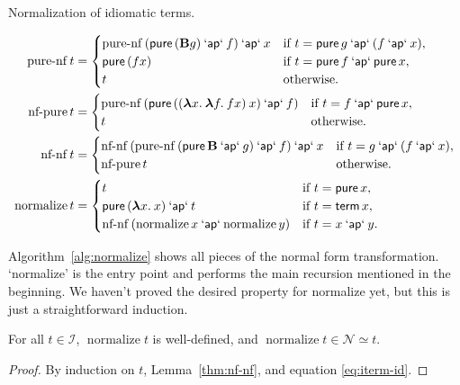 \begin{algorithm}
\caption{Normalization of idiomatic terms.}
\label{alg:normalize}
\begin{align*}
	\operatorname{pure-nf} t &= \begin{cases}
		\operatorname{pure-nf}{(\operatorname{\mathsf{pure}}{(\mathbf{B} g)} \mathbin{\mathsf{`ap`}} f)} \mathbin{\mathsf{`ap`}} x
			&\text{if } t = \operatorname{\mathsf{pure}} g \mathbin{\mathsf{`ap`}} (f \mathbin{\mathsf{`ap`}} x), \\
		\operatorname{\mathsf{pure}}{(f x)} &\text{if } t = \operatorname{\mathsf{pure}} f \mathbin{\mathsf{`ap`}} \operatorname{\mathsf{pure}} x, \\
		t &\text{otherwise.}
	\end{cases} \label{eq:pure-nf}\\
	\operatorname{nf-pure} t &= \begin{cases}
		\operatorname{pure-nf}{(\operatorname{\mathsf{pure}}{(({\boldsymbol\lambda} x.\>{\boldsymbol\lambda} f.\>f x) \> x)} \mathbin{\mathsf{`ap`}} f)}
			&\text{if } t = f \mathbin{\mathsf{`ap`}} \operatorname{\mathsf{pure}} x, \\
		t &\text{otherwise.}
	\end{cases} \label{eq:nf-pure}\\
	\operatorname{nf-nf} t &= \begin{cases}
		\operatorname{nf-nf}{(\operatorname{pure-nf}{(\operatorname{\mathsf{pure}} \mathbf{B} \mathbin{\mathsf{`ap`}} g)} \mathbin{\mathsf{`ap`}} f)} \mathbin{\mathsf{`ap`}} x
			&\text{if } t = g \mathbin{\mathsf{`ap`}} (f \mathbin{\mathsf{`ap`}} x), \\
		\operatorname{nf-pure} t &\text{otherwise.}
	\end{cases} \label{eq:nf-nf}\\
	\operatorname{normalize} t &= \begin{cases}
		t &\text{if } t = \operatorname{\mathsf{pure}} x, \\
		\operatorname{\mathsf{pure}}{({\boldsymbol\lambda} x.\>x)} \mathbin{\mathsf{`ap`}} t &\text{if } t = \operatorname{\mathsf{term}} x, \\
		\operatorname{nf-nf}{(\operatorname{normalize} x \mathbin{\mathsf{`ap`}} \operatorname{normalize} y)}
			&\text{if } t = x \mathbin{\mathsf{`ap`}} y.
	\end{cases} \label{eq:normalize-def}
\end{align*}
\end{algorithm}

Algorithm~\ref{alg:normalize} shows all pieces of the normal form
transformation.
`normalize' is the entry point and performs the main recursion mentioned in the
beginning.
We haven't proved the desired property for normalize yet, but this is just a
straightforward induction.

\begin{lemma}\label{thm:normalize}
For all $t \in \mathcal{I}$, $\operatorname{normalize} t$ is well-defined, and
$\operatorname{normalize} t \in \mathcal{N} \simeq t$.
\end{lemma}
\begin{proof}
By induction on $t$, Lemma~\ref{thm:nf-nf}, and equation \eqref{eq:iterm-id}.
\end{proof}

